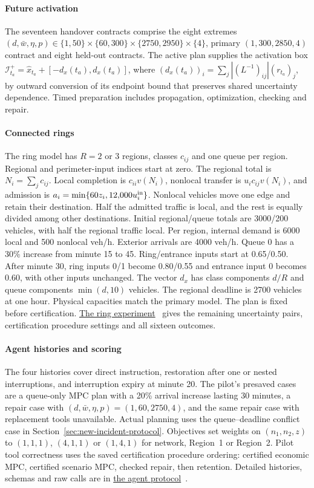 \documentclass[preprint,12pt]{elsarticle}
\theoremstyle{definition}
\theoremstyle{plain}
\theoremstyle{definition}
\theoremstyle{plain}
\newcommand{\reproductiondetails}[1]{\href{https://github.com/AlienEslami/agentic-perimeter-runtime-certification/releases/tag/paper-2026-11-10}{#1}~\cite{perimeterReproductionGuide}}
\begin{document}
\paragraph{Future activation}
\label{supp:detail:sec:delayed-handover-results}
\label{app:sequential-handover}
The seventeen handover contracts comprise the eight extremes
$(d,\bar w,\eta,p)\in\{1,50\}\times\{60,300\}\times
\{2750,2950\}\times\{4\}$, primary $(1,300,2850,4)$ contract and eight
held-out contracts. The active plan supplies the activation box
$\mathcal I_{t_a}^+=\widehat x_{t_a}+[-d_x(t_a),d_x(t_a)]$, where
$(d_x(t_a))_i=\sum_j|(L^{-1})_{ij}|(r_{t_a})_j$, by outward conversion of its
endpoint bound that preserves shared uncertainty dependence. Timed preparation includes propagation,
optimization, checking and repair.

\paragraph{Connected rings}
\label{app:network-transfer}
The ring model has $R=2$ or $3$ regions, classes $c_{ij}$ and one
queue per region. Regional and perimeter-input indices start at zero. The regional
total is $N_i=\sum_jc_{ij}$. Local completion is $c_{ii}v(N_i)$, nonlocal
transfer is $u_i c_{ij}v(N_i)$, and admission is $a_i=\min\{60z_i,12{,}000u_i^{\rm in}\}$. Nonlocal
vehicles move one edge and retain their destination. Half the admitted
traffic is local, and the rest is equally divided among other destinations.
Initial regional/queue totals are 3000/200 vehicles, with half the regional
traffic local. Per region, internal demand is 6000 local and 500 nonlocal
veh/h. Exterior arrivals are 4000 veh/h. Queue 0 has a 30\%
increase from minute 15 to 45. Ring/entrance inputs start at 0.65/0.50.
After minute 30, ring inputs 0/1 become 0.80/0.55 and entrance input 0
becomes 0.60, with other inputs unchanged. The vector $d_x$ has class components $d/R$ and queue components
$\min(d,10)$ vehicles. The regional deadline is 2700 vehicles
at one hour. Physical capacities match the primary model. The plan is
fixed before certification. \reproductiondetails{The ring experiment}
gives the remaining uncertainty pairs, certification procedure settings and all sixteen
outcomes.

\paragraph{Agent histories and scoring}
\label{sec:supp-execution}
The four histories cover direct instruction, restoration after one or
nested interruptions, and interruption expiry at minute 20. The pilot's presaved cases are a queue-only MPC plan with a 20\%
arrival increase lasting 30 minutes, a repair case with
$(d,\bar w,\eta,p)=(1,60,2750,4)$, and the same repair
case with replacement tools unavailable. Actual planning uses the
queue--deadline conflict case in Section~\ref{sec:new-incident-protocol}.
Objectives set weights on $(n_1,n_2,z)$ to $(1,1,1)$, $(4,1,1)$ or
$(1,4,1)$ for network, Region~1 or Region~2. Pilot tool correctness uses the saved
certification procedure ordering: certified economic MPC, certified scenario MPC,
checked repair, then retention. Detailed histories, schemas and raw
calls are in \reproductiondetails{the agent protocol}.
\end{document}
